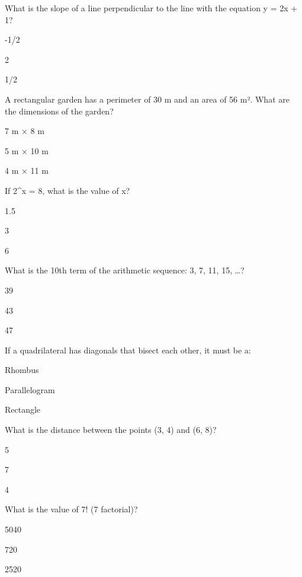 \begin{enhancedmcq}{What is the slope of a line perpendicular to the line with the equation y = 2x + 1?}
\item -1/2
\item 2
\item 1/2

\end{enhancedmcq}
\begin{enhancedmcq}{A rectangular garden has a perimeter of 30 m and an area of 56 m². What are the dimensions of the garden?}
\item 7 m × 8 m
\item 5 m × 10 m
\item 4 m × 11 m

\end{enhancedmcq}
\begin{enhancedmcq}{If 2^x = 8, what is the value of x?}
\item 1.5
\item 3
\item 6

\end{enhancedmcq}
\begin{enhancedmcq}{What is the 10th term of the arithmetic sequence: 3, 7, 11, 15, …?}
\item 39
\item 43
\item 47

\end{enhancedmcq}
\begin{enhancedmcq}{If a quadrilateral has diagonals that bisect each other, it must be a:}
\item Rhombus
\item Parallelogram
\item Rectangle

\end{enhancedmcq}
\begin{enhancedmcq}{What is the distance between the points (3, 4) and (6, 8)?}
\item 5
\item 7
\item 4

\end{enhancedmcq}
\begin{enhancedmcq}{What is the value of 7! (7 factorial)?}
\item 5040
\item 720
\item 2520

\end{enhancedmcq}
